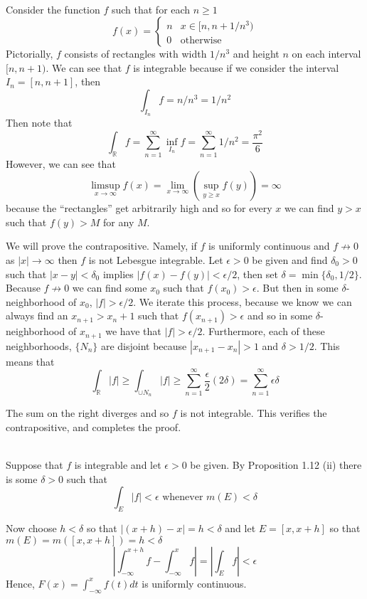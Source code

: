 \documentclass{article}
\DeclareMathOperator{\R}{\mathbb{R}}
\newcommand{\problem}[1]{\noindent{\textbf{Problem #1}}\\}
\newcommand{\problempart}[1]{\noindent{\textbf{(#1)}}}
\begin{document}
\problem{2.5.6}
\problempart{a} Consider the function $f$ such that for each $n \geq 1$
\[
f(x) = 
	\begin{cases}
		n & x \in [n, n + 1/n^3) \\
		0 & \text{otherwise}
	\end{cases}
\]
Pictorially, $f$ consists of rectangles with width $1/n^3$ and height $n$ on each interval $[n, n+1)$. We can see that $f$ is integrable because if we consider the interval $I_n = [n, n + 1]$, then 
\[
\int_{I_n} f = n/n^3 = 1/n^2
\]
Then note that 
\[
\int_{\R} f = \sum_{n = 1}^\infty \inf_{I_n} f = \sum_{n=1}^\infty 1/n^2 = \frac{\pi^2}{6}
\]
However, we can see that 
\[
\limsup_{x\to \infty} f(x) = \lim_{x\to\infty}(\sup_{y \geq x} f(y)) = \infty
\] 
because the ``rectangles'' get arbitrarily high and so for every $x$ we can find $y > x$ such that $f(y) > M$ for any $M$. 
 
\problempart{b} We will prove the contrapositive. Namely, if $f$ is uniformly continuous and $f \not\to 0$ as $|x| \to \infty$ then $f$ is not Lebesgue integrable. Let $\epsilon > 0$ be given and find $\delta_0 > 0$ such that $|x - y| < \delta_0$ implies $|f(x) - f(y)| < \epsilon/2$, then set $\delta = \min \{\delta_0, 1/2\}$. Because $f \not\to 0$ we can find some $x_0$ such that $f(x_0) > \epsilon$. But then in some $\delta$-neighborhood of $x_0$, $|f| > \epsilon/2$. We iterate this process, because we know we can always find an $x_{n+1} > x_n + 1$ such that $f(x_{n+1}) > \epsilon$ and so in some $\delta$-neighborhood of $x_{n+1}$ we have that $|f| > \epsilon/2$. Furthermore, each of these neighborhoods, $\{N_n\}$ are disjoint because $|x_{n+1} - x_n| > 1$ and $\delta > 1/2$. This means that
\[
\int_{\R} |f| \geq \int_{\cup N_n} |f| \geq \sum_{n=1}^\infty \frac{\epsilon}{2}(2\delta) = \sum_{n=1}^\infty \epsilon\delta
\] 

The sum on the right diverges and so $f$ is not integrable. This verifies the contrapositive, and completes the proof. 

\problem{2.5.8} Suppose that $f$ is integrable and let $\epsilon > 0$ be given. By Proposition 1.12 (ii) there is some $\delta > 0$ such that
\[
\int_{E} |f| < \epsilon \text{ whenever } m(E) < \delta
\]

Now choose $h < \delta$ so that $|(x+h) - x| = h < \delta$ and let $E = [x,x+h]$ so that $m(E) = m([x,x+h]) = h < \delta$
\[
\left|\int_{-\infty}^{x+h}f - \int_{-\infty}^x f\right|  = \left|\int_E f\right| < \epsilon
\] 
Hence, $F(x) = \int_{-\infty}^x f(t)dt$ is uniformly continuous.
 
\end{document}
